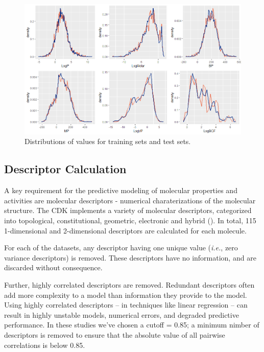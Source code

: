\documentclass[10pt, letter]{article}
\renewcommand{\=}{\, =\, }
\newcommand{\+}{\, +\, }
\renewcommand{\-}{\, -\, }
\begin{document}
\begin{figure}
  \caption{Distributions of values for training sets and test sets.}
  \centering
    \includegraphics[width=1.0\textwidth]{TrainTestDensity.png}
\end{figure}

\subsection{Descriptor Calculation}

A key requirement for the predictive modeling of molecular properties and activities are molecular descriptors - numerical charaterizations of the molecular structure. The CDK implements a variety of molecular descriptors, categorized into topological, constitutional, geometric, electronic and hybrid (). In total, 115 1-dimensional and 2-dimensional descriptors are calculated for each molecule.

For each of the datasets, any descriptor having one unique value (\textit{i.e.}, zero variance descriptors) is removed. These descriptors have no information, and are discarded without consequence.

Further, highly correlated descriptors are removed. Redundant descriptors often add more complexity to a model than information they provide to the model. Using highly correlated descriptors -- in techniques like linear regression -- can result in highly unstable models, numerical errors, and degraded predictive performance. In these studies we've chosen a cutoff = 0.85; a minimum nimber of descriptors is removed to ensure that the absolute value of all pairwise correlations is below 0.85.
\end{document}
